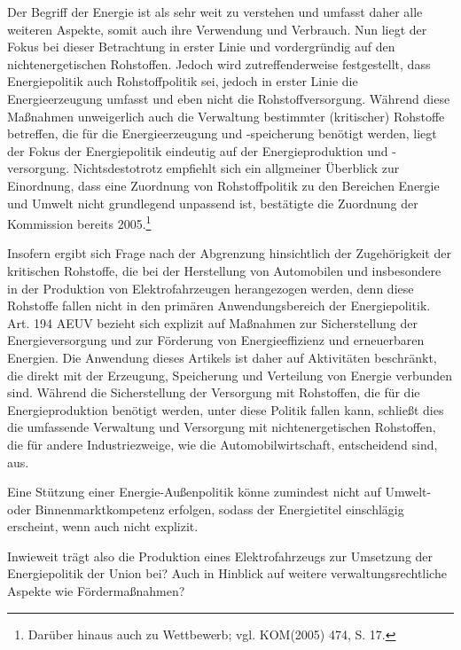 \documentclass[12pt,a4paper,oneside]{book} %
\begin{document}
Der Begriff der Energie ist als sehr weit zu verstehen und umfasst daher alle weiteren Aspekte, somit auch ihre Verwendung und Verbrauch.\autocite[Hamer Art. 194 Rn 8]{von_der_groeben_europaisches_2024} Nun liegt der Fokus bei dieser Betrachtung in erster Linie und vordergründig auf den nichtenergetischen Rohstoffen.
Jedoch wird  zutreffenderweise festgestellt, dass Energiepolitik auch Rohstoffpolitik sei, jedoch in erster Linie die Energieerzeugung umfasst und eben nicht die  Rohstoffversorgung. Während diese Maßnahmen unweigerlich auch die Verwaltung bestimmter (kritischer) Rohstoffe betreffen, die für die Energieerzeugung und -speicherung benötigt werden, liegt der Fokus der Energiepolitik eindeutig auf der Energieproduktion und -versorgung. Nichtsdestotrotz empfiehlt sich ein allgmeiner Überblick zur Einordnung, dass eine Zuordnung von Rohstoffpolitik zu den Bereichen Energie und Umwelt nicht grundlegend unpassend ist, bestätigte die Zuordnung der Kommission bereits 2005.\footnote{Darüber hinaus auch zu Wettbewerb; vgl. KOM(2005) 474, S. 17.}

Insofern ergibt sich Frage nach der Abgrenzung hinsichtlich der Zugehörigkeit der kritischen Rohstoffe, die bei der Herstellung von Automobilen und insbesondere in der Produktion von Elektrofahrzeugen herangezogen werden, denn diese Rohstoffe fallen nicht in den primären Anwendungsbereich der Energiepolitik. Art. 194 AEUV bezieht sich explizit auf Maßnahmen zur Sicherstellung der Energieversorgung und zur Förderung von Energieeffizienz und erneuerbaren Energien. Die Anwendung dieses Artikels ist daher auf Aktivitäten beschränkt, die direkt mit der Erzeugung, Speicherung und Verteilung von Energie verbunden sind. Während die Sicherstellung der Versorgung mit Rohstoffen, die für die Energieproduktion benötigt werden, unter diese Politik fallen kann, schließt dies die umfassende Verwaltung und Versorgung mit nichtenergetischen Rohstoffen, die für andere Industriezweige, wie die Automobilwirtschaft, entscheidend sind, aus.
	
Eine Stützung einer Energie-Außenpolitik könne zumindest nicht auf Umwelt- oder Binnenmarktkompetenz erfolgen, sodass der Energietitel einschlägig erscheint, wenn auch nicht explizit.\autocite{Gundel, Theobald/Kühling, Europäisches Energierecht, V. Rn. 87}
	
Inwieweit trägt also die Produktion eines Elektrofahrzeugs zur Umsetzung der Energiepolitik der Union bei? Auch in Hinblick auf weitere verwaltungsrechtliche Aspekte wie Fördermaßnahmen?
\end{document}
